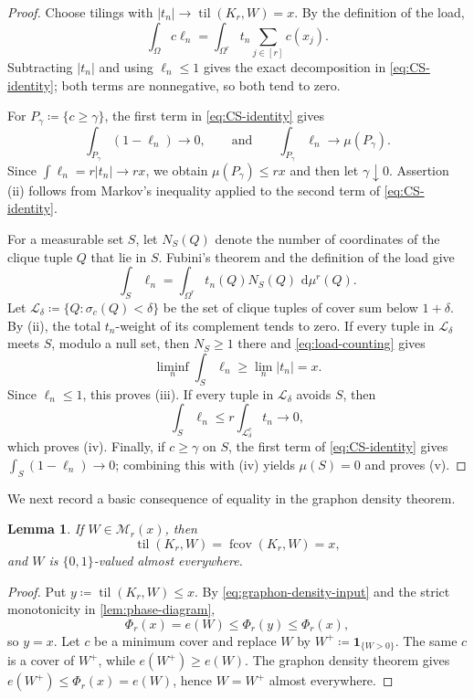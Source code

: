 \documentclass[10pt]{article}
\numberwithin{equation}{section}
\newtheorem{lemma}[lemma]{Lemma}
\newcommand{\til}{\operatorname{til}}
\newcommand{\fcov}{\operatorname{fcov}}
\newcommand{\one}{\mathbf 1}
\newcommand{\cM}{\mathcal M}
\newcommand{\dd}{\,\mathrm d}
\begin{document}
\begin{proof}
Choose tilings with $|t_n|\to\til(K_r,W)=x$.  By the definition of the load,
\[
 \int_\Omega c\ell_n
 =\int_{\Omega^r}t_n\sum_{j\in[r]}c(x_j).
\]
Subtracting $|t_n|$ and using $\ell_n\le1$ gives the exact decomposition in \cref{eq:CS-identity}; both terms are nonnegative, so both tend to zero.

For $P_\gamma\coloneqq\{c\ge\gamma\}$, the first term in \cref{eq:CS-identity} gives
\[
 \int_{P_\gamma}(1-\ell_n)\longrightarrow0,
 \qquad\text{and}\qquad
 \int_{P_\gamma}\ell_n\longrightarrow\mu(P_\gamma).
\]
Since $\int\ell_n=r|t_n|\to rx$, we obtain $\mu(P_\gamma)\le rx$ and then let $\gamma\downarrow0$.  Assertion \textup{(ii)} follows from Markov's inequality applied to the second term of \cref{eq:CS-identity}.

For a measurable set $S$, let $N_S(Q)$ denote the number of coordinates of the clique tuple $Q$ that lie in $S$.  Fubini's theorem and the definition of the load give
\begin{equation}\label{eq:load-counting}
 \int_S\ell_n
 =\int_{\Omega^r}t_n(Q)N_S(Q)\,\dd\mu^r(Q).
\end{equation}
Let $\mathcal L_\delta\coloneqq\{Q\colon \sigma_c(Q)<\delta\}$ be the set of clique tuples of cover sum below $1+\delta$.  By \textup{(ii)}, the total $t_n$-weight of its complement tends to zero.  If every tuple in $\mathcal L_\delta$ meets $S$, modulo a null set, then $N_S\ge1$ there and \cref{eq:load-counting} gives
\[
 \liminf_n\int_S\ell_n\ge\lim_n|t_n|=x.
\]
Since $\ell_n\le1$, this proves \textup{(iii)}.  If every tuple in $\mathcal L_\delta$ avoids $S$, then
\[
 \int_S\ell_n
 \le r\int_{\mathcal L_\delta^c}t_n\longrightarrow0,
\]
which proves \textup{(iv)}.  Finally, if $c\ge\gamma$ on $S$, the first term of \cref{eq:CS-identity} gives $\int_S(1-\ell_n)\to0$; combining this with \textup{(iv)} yields $\mu(S)=0$ and proves \textup{(v)}.
\end{proof}

We next record a basic consequence of equality in the graphon density theorem.

\begin{lemma}\label{lem:extremizer-saturation}
If $W\in\cM_r(x)$, then
\[
 \til(K_r,W)=\fcov(K_r,W)=x,
\]
and $W$ is $\{0,1\}$-valued almost everywhere.
\end{lemma}

\begin{proof}
Put $y\coloneqq\til(K_r,W)\le x$.  By \cref{eq:graphon-density-input} and the strict monotonicity in \cref{lem:phase-diagram},
\[
 \Phi_r(x)=e(W)\le \Phi_r(y)\le \Phi_r(x),
\]
so $y=x$.  Let $c$ be a minimum cover and replace $W$ by $W^+\coloneqq\one_{\{W>0\}}$.  The same $c$ is a cover of $W^+$, while $e(W^+)\ge e(W)$.  The graphon density theorem gives $e(W^+)\le \Phi_r(x)=e(W)$, hence $W=W^+$ almost everywhere.
\end{proof}
\end{document}
